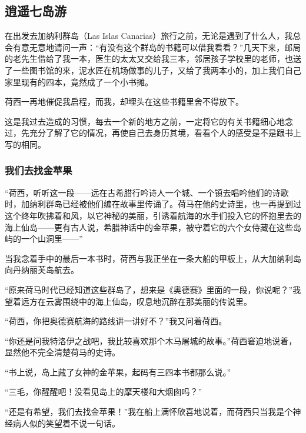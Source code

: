 \subsection{逍遥七岛游}

\par 在出发去加纳利群岛（Las Islas Canarias）旅行之前，无论是遇到了什么人，我总会有意无意地请问一声：“有没有这个群岛的书籍可以借我看看？”几天下来，邮局的老先生借给了我一本，医生的太太又交给我三本，邻居孩子学校里的老师，也送了一些图书馆的来，泥水匠在机场做事的儿子，又给了我两本小的，加上我们自己家里现有的四本，竟然成了一个小书摊。
\par 荷西一再地催促我启程，而我，却埋头在这些书籍里舍不得放下。
\par 这是我过去造成的习惯，每去一个新的地方之前，一定将它的有关书籍细心地念过，先充分了解了它的情况，再使自己去身历其境，看看个人的感受是不是跟书上写的相同。
\subsubsection*{我们去找金苹果}
\par “荷西，听听这一段——远在古希腊行吟诗人一个城、一个镇去唱吟他们的诗歌时，加纳利群岛已经被他们编在故事里传诵了。荷马在他的史诗里，也一再提到过这个终年吹拂着和风，以它神秘的美丽，引诱着航海的水手们投入它的怀抱里去的海上仙岛——更有古人说，希腊神话中的金苹果，被守着它的六个女侍藏在这些岛屿的一个山洞里——”
\par 当我念着手中的最后一本书时，荷西与我正坐在一条大船的甲板上，从大加纳利岛向丹纳丽芙岛航去。
\par “原来荷马时代已经知道这些群岛了，想来是《奥德赛》里面的一段，你说呢？”我望着远方在云雾围绕中的海上仙岛，叹息地沉醉在那美丽的传说里。
\par “荷西，你把奥德赛航海的路线讲一讲好不？”我又问着荷西。
\par “你还是问我特洛伊之战吧，我比较喜欢那个木马屠城的故事。”荷西窘迫地说着，显然他不完全清楚荷马的史诗。
\par “书上说，岛上藏了女神的金苹果，起码有三四本书都那么说。”
\par “三毛，你醒醒吧！没看见岛上的摩天楼和大烟囱吗？”
\par “还是有希望，我们去找金苹果！”我在船上满怀欣喜地说着，而荷西只当我是个神经病人似的笑望着不说一句话。
